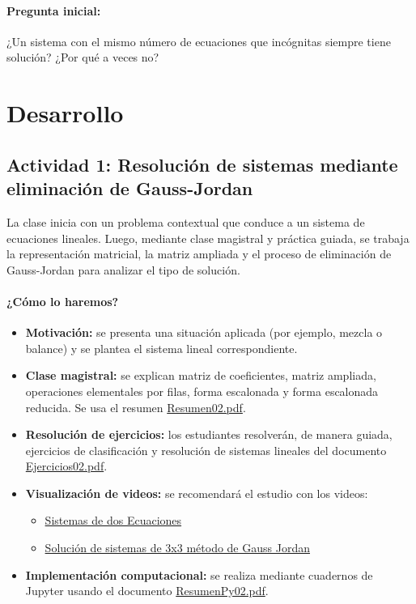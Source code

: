 \documentclass[a4,11pt]{aleph-notas}
\begin{document}
\paragraph{Pregunta inicial:}
¿Un sistema con el mismo número de ecuaciones que incógnitas siempre tiene solución? ¿Por qué a veces no?

\section*{Desarrollo}

\subsection*{Actividad 1: Resolución de sistemas mediante eliminación de Gauss-Jordan}

La clase inicia con un problema contextual que conduce a un sistema de ecuaciones lineales. Luego, mediante clase magistral y práctica guiada, se trabaja la representación matricial, la matriz ampliada y el proceso de eliminación de Gauss-Jordan para analizar el tipo de solución.

\paragraph{¿Cómo lo haremos?}
\begin{itemize}[leftmargin=*]
    \item \textbf{Motivación:} se presenta una situación aplicada (por ejemplo, mezcla o balance) y se plantea el sistema lineal correspondiente.
    \item \textbf{Clase magistral:} se explican matriz de coeficientes, matriz ampliada, operaciones elementales por filas, forma escalonada y forma escalonada reducida. Se usa el resumen \href{https://fcena-puce.github.io/AlgebraLineal-05-N0048/01Resumen/Resumen02.pdf}{Resumen02.pdf}.
    \item \textbf{Resolución de ejercicios:} los estudiantes resolverán, de manera guiada, ejercicios de clasificación y resolución de sistemas lineales del documento \href{https://fcena-puce.github.io/AlgebraLineal-05-N0048/04Ejercicios/Ejercicios02.pdf}{Ejercicios02.pdf}.
    \item \textbf{Visualización de videos:} se recomendará el estudio con los videos:  
    \begin{itemize}
        \item \href{https://www.youtube.com/watch?v=IF7WV5VVci4}{Sistemas de dos Ecuaciones}
        \item \href{https://www.youtube.com/watch?v=dFmGzr1j6eY}{Solución de sistemas de 3x3 método de Gauss Jordan}
    \end{itemize}  
    \item \textbf{Implementación computacional:} se realiza mediante cuadernos de Jupyter usando el documento \href{https://fcena-puce.github.io/AlgebraLineal-05-N0048/02ResumenPython/ResumenPy02.pdf}{ResumenPy02.pdf}.
\end{itemize}
\end{document}
